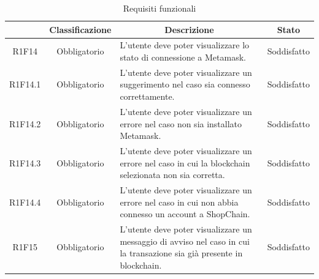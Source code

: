 \begin{table}[H]
    \centering
    \renewcommand{\arraystretch}{1.8}
    \begin{tabular}{c | c | p{6cm} | c}
        \rowcolor[HTML]{125E28}
        \multicolumn{1}{c}{\color[HTML]{FFFFFF} \textbf{Codice}}          &
        \multicolumn{1}{c}{\color[HTML]{FFFFFF} \textbf{Classificazione}} &
        \multicolumn{1}{c}{\color[HTML]{FFFFFF} \textbf{Descrizione}}     &
        \multicolumn{1}{c}{\color[HTML]{FFFFFF} \textbf{Stato}}                                                                                                                                                                   \\
        \hline
        R1F14                                                             & Obbligatorio & L'utente deve poter visualizzare lo stato di connessione a Metamask\glo{}.                                       &Soddisfatto                      \\
        R1F14.1                                                           & Obbligatorio & L'utente deve poter visualizzare un suggerimento nel caso sia connesso correttamente.                      & Soddisfatto                     \\
        R1F14.2                                                           & Obbligatorio & L'utente deve poter visualizzare un errore nel caso non sia installato Metamask\glo{}.                                             & Soddisfatto   \\
        R1F14.3                                                           & Obbligatorio & L'utente deve poter visualizzare un errore nel caso in cui la blockchain selezionata non sia corretta.                       & Soddisfatto   \\
        R1F14.4                                                           & Obbligatorio & L'utente deve poter visualizzare un errore nel caso in cui non abbia connesso un account a ShopChain.                        & Soddisfatto   \\
        R1F15                                                             & Obbligatorio & L'utente deve poter visualizzare un messaggio di avviso nel caso in cui la transazione sia già presente in blockchain\glo{}. & Soddisfatto \\
    \end{tabular}
    \caption{Requisiti funzionali}
\end{table}


